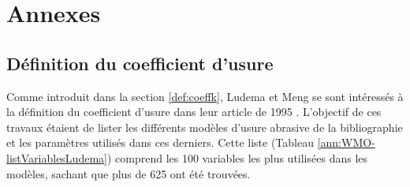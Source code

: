 \blankpage
\chapter*{Annexes}
\makeatletter
\renewcommand\listoftables{%
    \@starttoc{lot}%
}
\makeatother
{}
\renewcommand{\thesection}{\Alph{section}}
\setcounter{section}{0}
\setcounter{figure}{0}
\setcounter{table}{0}
\captionsetup[figure]{list=no}
\captionsetup[table]{list=no}
\captionsetup{labelformat=AppendixTables}

\section{Définition du coefficient d'usure\label{appendix:Ludema}}

Comme introduit dans la section \ref{def:coeffk}, Ludema et Meng se sont intéressés à la définition du coefficient d'usure dans leur article de 1995 \cite{Meng1995}. L'objectif de ces travaux étaient de lister les différents modèles d'usure abrasive de la bibliographie et les paramètres utilisés dans ces derniers. Cette liste (Tableau \ref{ann:WMO-listVariablesLudema}) comprend les 100 variables les plus utilisées dans les modèles, sachant que plus de 625 ont été trouvées.

